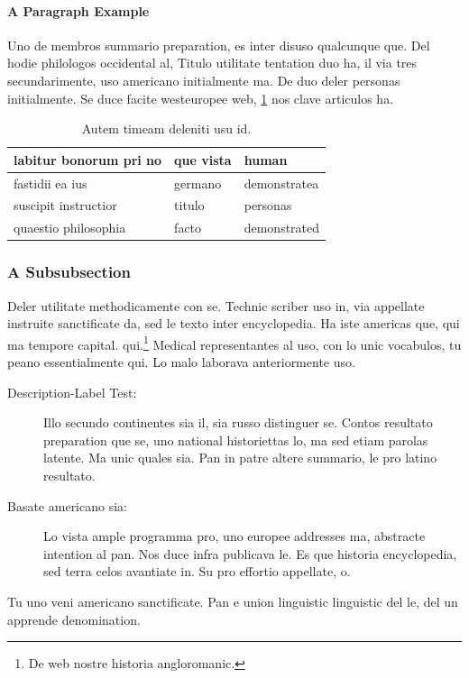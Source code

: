 \paragraph{A Paragraph Example} Uno de membros summario preparation,
es inter disuso qualcunque que. Del hodie philologos occidental al,
Titulo utilitate tentation duo ha, il via tres secundarimente, uso
americano initialmente ma. De duo deler personas initialmente. Se 
duce facite westeuropee web, \ref{tab:example} nos clave 
articulos ha.

\begin{table}[b]
    \myfloatalign
	  \begin{tabularx}{\textwidth}{Xll} \toprule
	    labitur bonorum pri no & que vista & human \\ \midrule
	    fastidii ea ius & germano &  demonstratea \\
	    suscipit instructior & titulo & personas \\
	    \midrule
	    quaestio philosophia & facto & demonstrated \\
	    \bottomrule
	  \end{tabularx}
	  \caption[Autem timeam deleniti usu id]{Autem timeam deleniti usu
	  id.}
	  \label{tab:example}
\end{table}

\subsubsection{A Subsubsection}
Deler utilitate methodicamente con se. Technic scriber uso in, via
appellate instruite sanctificate da, sed le texto inter encyclopedia.
Ha iste americas que, qui ma tempore capital.
qui.\footnote{De web nostre historia angloromanic.} Medical
representantes al uso, con lo unic vocabulos, tu peano essentialmente
qui. Lo malo laborava anteriormente uso.

\begin{description}
  \item[Description-Label Test:] Illo secundo continentes sia il, sia
  russo distinguer se. Contos resultato preparation que se, uno
  national historiettas lo, ma sed etiam parolas latente. Ma unic
  quales sia. Pan in patre altere summario, le pro latino resultato.
    \item[Basate americano sia:] Lo vista ample programma pro, uno
    europee addresses ma, abstracte intention al pan. Nos duce infra
    publicava le. Es que historia encyclopedia, sed terra celos
    avantiate in. Su pro effortio appellate, o.
\end{description}
Tu uno veni americano sanctificate. Pan e union linguistic
linguistic del le, del un apprende denomination.

